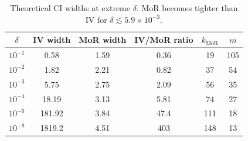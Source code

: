 \begin{table}[t]
\centering
\caption{Theoretical CI widths at extreme $\delta$. MoR becomes tighter than IV for $\delta \lesssim 5.9 \times 10^{-3}$.}
\label{tab:extreme_delta}
\renewcommand{\arraystretch}{1.3}
\begin{tabular}{cccccc}
\toprule
$\delta$ & IV width & MoR width & IV/MoR ratio & $k_{\mathrm{MoR}}$ & $m$ \\
\midrule
$10^{-1}$ & 0.58 & 1.59 & 0.36 & 19 & 105 \\
$10^{-2}$ & 1.82 & 2.21 & 0.82 & 37 & 54 \\
$10^{-3}$ & 5.75 & 2.75 & 2.09 & 56 & 35 \\
$10^{-4}$ & 18.19 & 3.13 & 5.81 & 74 & 27 \\
$10^{-6}$ & 181.92 & 3.84 & 47.4 & 111 & 18 \\
$10^{-8}$ & 1819.2 & 4.51 & 403 & 148 & 13 \\
\bottomrule
\end{tabular}
\end{table}
